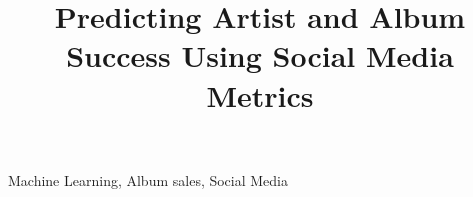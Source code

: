 \documentclass[conference]{IEEEtran}
\begin{document}
%
\title{Predicting Artist and Album Success Using Social Media Metrics}


\author{
\and
{}
\and
{}
}



\maketitle


\begin{abstract}
\blindtext[1]
\end{abstract}

\begin{IEEEkeywords}
Machine Learning, Album sales, Social Media
\end{IEEEkeywords}


%
\IEEEpeerreviewmaketitle
\end{document}
